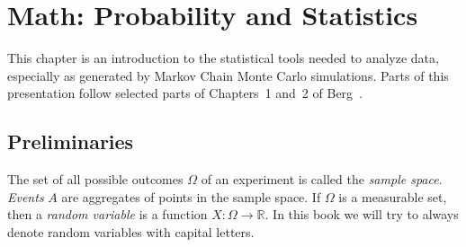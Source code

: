 \chapter{Math: Probability and Statistics}

This chapter is an introduction to the statistical
tools needed to analyze data, especially as generated by Markov Chain
Monte Carlo simulations. Parts of this presentation follow selected parts
of Chapters~1 and~2 of Berg~\cite{berg_markov_2004}.

\section{Preliminaries}
The set of all possible outcomes $\Omega$ of an experiment is called the 
{\it sample space}. {\it Events} $A$ 
are aggregates of points in the sample space. If $\Omega$ is a measurable set, 
then a {\it random variable} is a 
function $X:\Omega\to\mathbb{R}$. In this book we will try to always
denote random variables with capital letters.

